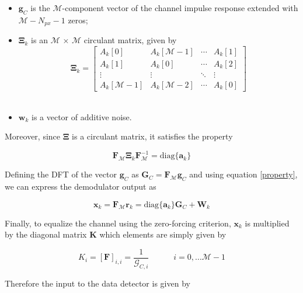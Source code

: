 \documentclass[a4paper, 12pt]{report}
\begin{document}
\begin{itemize}
	\item $\mathbf{g}_C$ is the $\mathcal{M}$-component vector of the channel impulse response extended with $\mathcal{M}-N_{px}-1$ zeros;
	\item $\mathbf{\Xi}_k$ is an $\mathcal{M}$ $\times$ $\mathcal{M}$ circulant matrix, given by
	\begin{equation*}
	\mathbf{\Xi}_k = \begin{bmatrix}
						A_k[0] & A_k[\mathcal{M}-1] & \cdots & A_k[1] \\
						A_k[1] & A_k[0] & \cdots & A_k[2] \\
						\vdots & \vdots & \ddots & \vdots \\
						A_k[\mathcal{M}-1] & A_k[\mathcal{M}-2] & \cdots & A_k[0]
	\end{bmatrix}
	\end{equation*} \\
	
	\item $ \mathbf{w}_k$ is a vector of additive noise. 
\end{itemize}

Moreover, since $\mathbf{\Xi}$ is a circulant matrix, it satisfies the property

\begin{equation}\label{property}
\mathbf{F}_\mathcal{M} \mathbf{\Xi}_k \mathbf{F}_\mathcal{M}^{-1} = \text{diag}\{\mathbf{a}_k\}
\end{equation}

Defining the DFT of the vector $\mathbf{g}_C$ as $\mathbf{G}_C = \mathbf{F}_\mathcal{M}\mathbf{g}_C$ and using equation \eqref{property}, we can express the demodulator output as 

\begin{equation}
\mathbf{x}_k = \mathbf{F}_\mathcal{M}\mathbf{r}_k = \text{diag}\{\mathbf{a}_k\}\mathbf{G}_C + \mathbf{W}_k
\end{equation}

Finally, to equalize the channel using the zero-forcing criterion, $\mathbf{x}_k$ is multiplied by the diagonal matrix $\mathbf{K}$ which elements are simply given by

\begin{equation}
K_i = [\mathbf{F}]_{i,i} = \dfrac{1}{\mathcal{G}_{C,i}} \quad\quad\quad i=0,\dots \mathcal{M}-1
\end{equation}

Therefore the input to the data detector is given by
\end{document}
